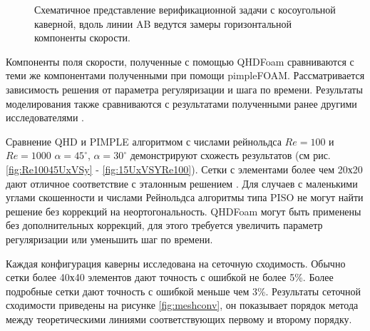 \begin{figure}
    \centering
    \caption{Схематичное представление верификационной задачи с косоугольной каверной, вдоль линии AB ведутся замеры горизонтальной компоненты скорости.}
    \label{fig:skewedCavityScratch}
\end{figure}

Компоненты поля скорости, полученные с помощью QHDFoam сравниваются с теми же компонентами полученными при помощи pimpleFOAM. Рассматривается зависимость решения от параметра регуляризации и шага по времени. Результаты моделирования также сравниваются с результатами полученными ранее другими исследователями \cite{Hines2008,Erturk2007}. 

Сравнение QHD и PIMPLE алгоритмом с числами рейнольдса $Re=100$ и $Re=1000$ $\alpha = 45^{\circ}$, $\alpha = 30^{\circ}$ демонстрируют схожесть результатов (см рис. \ref{fig:Re10045UxVSy} - \ref{fig:15UxVSYRe100}). Сетки с элементами более чем 20х20 дают отличное соответствие с эталонным решением \cite{Erturk2007}. Для случаев с маленькими углами скошенности и числами Рейнольдса алгоритмы типа PISO не могут найти решение без коррекций на неортогональность. QHDFoam могут быть применены без дополнительных коррекций, для этого требуется увеличить параметр регуляризации или уменьшить шаг по времени.

Каждая конфигурация каверны исследована на сеточную сходимость. Обычно сетки более 40х40 элементов дают точность с ошибкой не более 5\%. Более подробные сетки дают точность с ошибкой меньше чем 3\%. Результаты сеточной сходимости приведены на рисунке \ref{fig:meshconv}, он показывает порядок метода между теоретическими линиями соответствующих первому и второму порядку.

